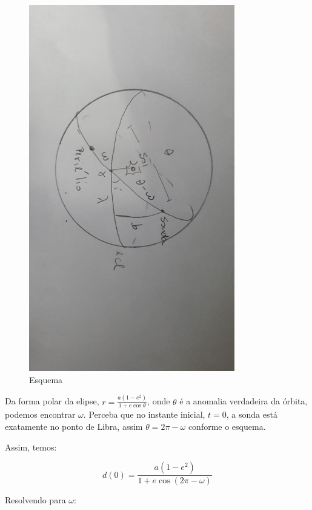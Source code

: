\documentclass[11pt]{article}
\begin{document}
\begin{pproblem}
\begin{pssolution*}{}{}
\begin{alternativas}
            \begin{figure}[H]
                \centering
                \includegraphics[angle=90, width=0.8\textwidth]{imagens/trigesfericoorbita.jpg}
                \caption{Esquema}
            \end{figure}

            Da forma polar da elipse, \(r=\frac{a(1-e^2)}{1+e\cos\theta}\), onde \(\theta\) é a anomalia verdadeira da órbita, podemos encontrar \(\omega\). Perceba que no instante inicial, \(t=0\), a sonda está exatamente no ponto de Libra, assim \(\theta = 2\pi-\omega\) conforme o esquema.

            Assim, temos:

            \[d(0) = \frac{a(1-e^2)}{1+e\cos(2\pi-\omega)}\]

            Resolvendo para \(\omega\):


\end{alternativas}
\end{pssolution*}
\end{pproblem}
\end{document}
